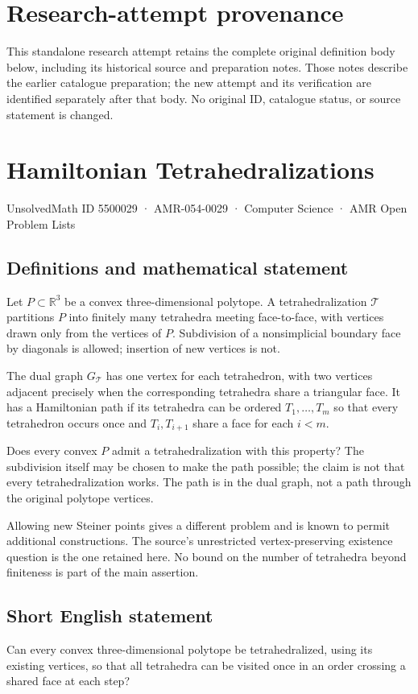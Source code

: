 \documentclass[11pt,a4paper]{article}
\begin{document}
\section*{Research-attempt provenance}
This standalone research attempt retains the complete original definition body below,
including its historical source and preparation notes. Those notes describe the
earlier catalogue preparation; the new attempt and its verification are identified
separately after that body. No original ID, catalogue status, or source statement is changed.

\section*{Hamiltonian Tetrahedralizations}\label{5500029}
{\small UnsolvedMath ID 5500029 · AMR-054-0029 · Computer Science · AMR Open Problem Lists}
\subsection{Definitions and mathematical statement}
Let $P\subset\mathbb R^3$ be a convex three-dimensional polytope. A
tetrahedralization $\mathcal T$ partitions $P$ into finitely many
tetrahedra meeting face-to-face, with vertices drawn only from the
vertices of $P$. Subdivision of a nonsimplicial boundary face by
diagonals is allowed; insertion of new vertices is not.

The dual graph $G_{\mathcal T}$ has one vertex for each tetrahedron,
with two vertices adjacent precisely when the corresponding
tetrahedra share a triangular face. It has a Hamiltonian path if its
tetrahedra can be ordered $T_1,\ldots,T_m$ so that every tetrahedron
occurs once and $T_i,T_{i+1}$ share a face for each $i<m$.

Does every convex $P$ admit a tetrahedralization with this property?
The subdivision itself may be chosen to make the path possible;
the claim is not that every tetrahedralization works. The path is
in the dual graph, not a path through the original polytope vertices.

Allowing new Steiner points gives a different problem and is known
to permit additional constructions. The source's unrestricted
vertex-preserving existence question is the one retained here.
No bound on the number of tetrahedra beyond finiteness is part of
the main assertion.
\subsection{Short English statement}
Can every convex three-dimensional polytope be tetrahedralized, using
its existing vertices, so that all tetrahedra can be visited once in
an order crossing a shared face at each step?
\end{document}
